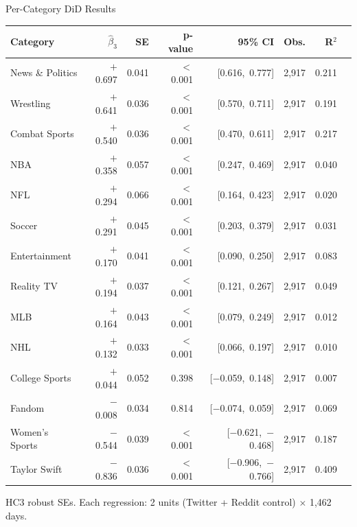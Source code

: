 \documentclass[aspectratio=169,t]{beamer}
\begin{document}
\begin{frame}{Per-Category DiD Results}
\vspace{0.2em}
\begin{center}
\scriptsize
\setlength{\tabcolsep}{5pt}
\renewcommand{\arraystretch}{0.9}
\begin{tabular}{lrrrrrrr}
\toprule
\textbf{Category} & \textbf{$\hat{\beta}_3$} & \textbf{SE} & \textbf{p-value} & \textbf{95\% CI} & \textbf{Obs.} & \textbf{R$^2$} \\
\midrule
\textcolor{uteporange}{News \& Politics}   & $+$0.697 & 0.041 & $<$0.001 & [0.616,\ 0.777] & 2,917 & 0.211 \\
\textcolor{uteporange}{Wrestling}          & $+$0.641 & 0.036 & $<$0.001 & [0.570,\ 0.711] & 2,917 & 0.191 \\
\textcolor{uteporange}{Combat Sports}      & $+$0.540 & 0.036 & $<$0.001 & [0.470,\ 0.611] & 2,917 & 0.217 \\
\textcolor{uteporange}{NBA}                & $+$0.358 & 0.057 & $<$0.001 & [0.247,\ 0.469] & 2,917 & 0.040 \\
\textcolor{uteporange}{NFL}                & $+$0.294 & 0.066 & $<$0.001 & [0.164,\ 0.423] & 2,917 & 0.020 \\
\textcolor{uteporange}{Soccer}             & $+$0.291 & 0.045 & $<$0.001 & [0.203,\ 0.379] & 2,917 & 0.031 \\
\textcolor{uteporange}{Entertainment}      & $+$0.170 & 0.041 & $<$0.001 & [0.090,\ 0.250] & 2,917 & 0.083 \\
\textcolor{uteporange}{Reality TV}         & $+$0.194 & 0.037 & $<$0.001 & [0.121,\ 0.267] & 2,917 & 0.049 \\
\textcolor{uteporange}{MLB}                & $+$0.164 & 0.043 & $<$0.001 & [0.079,\ 0.249] & 2,917 & 0.012 \\
\textcolor{uteporange}{NHL}                & $+$0.132 & 0.033 & $<$0.001 & [0.066,\ 0.197] & 2,917 & 0.010 \\
\textcolor{utepsilver}{College Sports}     & $+$0.044 & 0.052 & 0.398    & [$-$0.059,\ 0.148] & 2,917 & 0.007 \\
\textcolor{utepsilver}{Fandom}             & $-$0.008 & 0.034 & 0.814    & [$-$0.074,\ 0.059] & 2,917 & 0.069 \\
\textcolor{utepblue}{Women's Sports}       & $-$0.544 & 0.039 & $<$0.001 & [$-$0.621,\ $-$0.468] & 2,917 & 0.187 \\
\textcolor{utepblue}{Taylor Swift}         & $-$0.836 & 0.036 & $<$0.001 & [$-$0.906,\ $-$0.766] & 2,917 & 0.409 \\
\bottomrule
\end{tabular}

\vspace{0.3em}
{\scriptsize\textcolor{utepsilver}{HC3 robust SEs. Each regression: 2 units (Twitter + Reddit control) $\times$ 1,462 days.}}
\end{center}
\end{frame}
\end{document}

